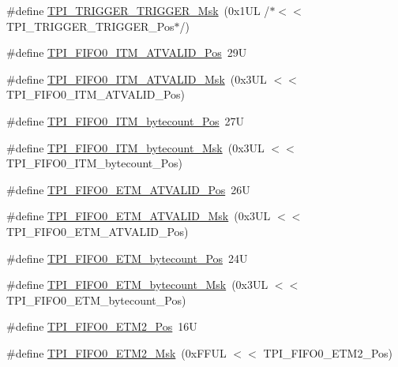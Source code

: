 \begin{DoxyCompactItemize}
\item 
\#define \hyperlink{group___c_m_s_i_s___t_p_i_ga814227af2b2665a0687bb49345e21110}{T\+P\+I\+\_\+\+T\+R\+I\+G\+G\+E\+R\+\_\+\+T\+R\+I\+G\+G\+E\+R\+\_\+\+Msk}~(0x1\+U\+L /$\ast$$<$$<$ T\+P\+I\+\_\+\+T\+R\+I\+G\+G\+E\+R\+\_\+\+T\+R\+I\+G\+G\+E\+R\+\_\+\+Pos$\ast$/)
\item 
\#define \hyperlink{group___c_m_s_i_s___t_p_i_gaa7e050e9eb6528241ebc6835783b6bae}{T\+P\+I\+\_\+\+F\+I\+F\+O0\+\_\+\+I\+T\+M\+\_\+\+A\+T\+V\+A\+L\+I\+D\+\_\+\+Pos}~29U
\item 
\#define \hyperlink{group___c_m_s_i_s___t_p_i_ga94cb2493ed35d2dab7bd4092b88a05bc}{T\+P\+I\+\_\+\+F\+I\+F\+O0\+\_\+\+I\+T\+M\+\_\+\+A\+T\+V\+A\+L\+I\+D\+\_\+\+Msk}~(0x3\+U\+L $<$$<$ T\+P\+I\+\_\+\+F\+I\+F\+O0\+\_\+\+I\+T\+M\+\_\+\+A\+T\+V\+A\+L\+I\+D\+\_\+\+Pos)
\item 
\#define \hyperlink{group___c_m_s_i_s___t_p_i_gac2b6f7f13a2fa0be4aa7645a47dcac52}{T\+P\+I\+\_\+\+F\+I\+F\+O0\+\_\+\+I\+T\+M\+\_\+bytecount\+\_\+\+Pos}~27U
\item 
\#define \hyperlink{group___c_m_s_i_s___t_p_i_ga07bafa971b8daf0d63b3f92b9ae7fa16}{T\+P\+I\+\_\+\+F\+I\+F\+O0\+\_\+\+I\+T\+M\+\_\+bytecount\+\_\+\+Msk}~(0x3\+U\+L $<$$<$ T\+P\+I\+\_\+\+F\+I\+F\+O0\+\_\+\+I\+T\+M\+\_\+bytecount\+\_\+\+Pos)
\item 
\#define \hyperlink{group___c_m_s_i_s___t_p_i_ga7fdeb3e465ca4aa9e3b2f424ab3bbd1d}{T\+P\+I\+\_\+\+F\+I\+F\+O0\+\_\+\+E\+T\+M\+\_\+\+A\+T\+V\+A\+L\+I\+D\+\_\+\+Pos}~26U
\item 
\#define \hyperlink{group___c_m_s_i_s___t_p_i_ga4f0005dc420b28f2369179a935b9a9d3}{T\+P\+I\+\_\+\+F\+I\+F\+O0\+\_\+\+E\+T\+M\+\_\+\+A\+T\+V\+A\+L\+I\+D\+\_\+\+Msk}~(0x3\+U\+L $<$$<$ T\+P\+I\+\_\+\+F\+I\+F\+O0\+\_\+\+E\+T\+M\+\_\+\+A\+T\+V\+A\+L\+I\+D\+\_\+\+Pos)
\item 
\#define \hyperlink{group___c_m_s_i_s___t_p_i_ga2f738e45386ebf58c4d406f578e7ddaf}{T\+P\+I\+\_\+\+F\+I\+F\+O0\+\_\+\+E\+T\+M\+\_\+bytecount\+\_\+\+Pos}~24U
\item 
\#define \hyperlink{group___c_m_s_i_s___t_p_i_gad2536b3a935361c68453cd068640af92}{T\+P\+I\+\_\+\+F\+I\+F\+O0\+\_\+\+E\+T\+M\+\_\+bytecount\+\_\+\+Msk}~(0x3\+U\+L $<$$<$ T\+P\+I\+\_\+\+F\+I\+F\+O0\+\_\+\+E\+T\+M\+\_\+bytecount\+\_\+\+Pos)
\item 
\#define \hyperlink{group___c_m_s_i_s___t_p_i_ga5f0037cc80c65e86d9e94e5005077a48}{T\+P\+I\+\_\+\+F\+I\+F\+O0\+\_\+\+E\+T\+M2\+\_\+\+Pos}~16U
\item 
\#define \hyperlink{group___c_m_s_i_s___t_p_i_gaa82a7b9b99c990fb12eafb3c84b68254}{T\+P\+I\+\_\+\+F\+I\+F\+O0\+\_\+\+E\+T\+M2\+\_\+\+Msk}~(0x\+F\+F\+U\+L $<$$<$ T\+P\+I\+\_\+\+F\+I\+F\+O0\+\_\+\+E\+T\+M2\+\_\+\+Pos)
$$
\end{DoxyCompactItemize}
